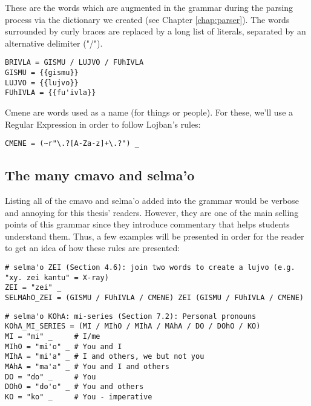 These are the words which are augmented in the grammar during the parsing process via the dictionary we created
(see Chapter \ref{chap:parser}). The words surrounded by curly braces are replaced by a long list of literals, separated
by an alternative delimiter ("/").

\begin{lstlisting}[caption=BRIVLA rule]
BRIVLA = GISMU / LUJVO / FUhIVLA
GISMU = {{gismu}}
LUJVO = {{lujvo}}
FUhIVLA = {{fu'ivla}}
\end{lstlisting}

\newpage

Cmene are words used as a name (for things or people). For these, we'll use a Regular Expression in order to follow Lojban's rules:

\begin{lstlisting}[caption=CMENE rule]
CMENE = (~r"\.?[A-Za-z]+\.?") _
\end{lstlisting}

\subsection{The many cmavo and selma'o}

Listing all of the cmavo and selma'o added into the grammar would be verbose and annoying for this thesis' readers. However, they are
one of the main selling points of this grammar since they introduce commentary that helps students understand them. Thus, a few examples will
be presented in order for the reader to get an idea of how these rules are presented:

\begin{lstlisting}[caption=SELMAhO\_ZEI rule]
# selma'o ZEI (Section 4.6): join two words to create a lujvo (e.g. "xy. zei kantu" = X-ray)
ZEI = "zei" _
SELMAhO_ZEI = (GISMU / FUhIVLA / CMENE) ZEI (GISMU / FUhIVLA / CMENE)
\end{lstlisting}

\begin{lstlisting}[caption=KOhA\_MI\_SERIES rule]
# selma'o KOhA: mi-series (Section 7.2): Personal pronouns
KOhA_MI_SERIES = (MI / MIhO / MIhA / MAhA / DO / DOhO / KO)
MI = "mi" _     # I/me
MIhO = "mi'o" _ # You and I
MIhA = "mi'a" _ # I and others, we but not you
MAhA = "ma'a" _ # You and I and others
DO = "do" _     # You
DOhO = "do'o" _ # You and others
KO = "ko" _     # You - imperative
\end{lstlisting}